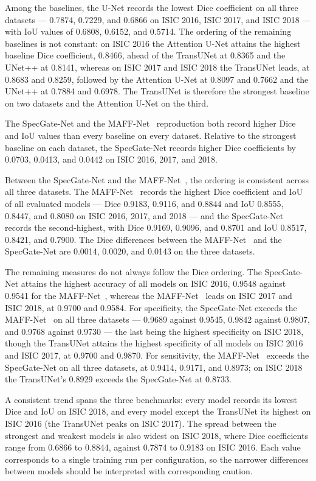 Among the baselines, the U-Net records the lowest Dice coefficient on all three datasets --- 0.7874, 0.7229, and 0.6866 on ISIC 2016, ISIC 2017, and ISIC 2018 --- with IoU values of 0.6808, 0.6152, and 0.5714. The ordering of the remaining baselines is not constant: on ISIC 2016 the Attention U-Net attains the highest baseline Dice coefficient, 0.8466, ahead of the TransUNet at 0.8365 and the UNet++ at 0.8141, whereas on ISIC 2017 and ISIC 2018 the TransUNet leads, at 0.8683 and 0.8259, followed by the Attention U-Net at 0.8097 and 0.7662 and the UNet++ at 0.7884 and 0.6978. The TransUNet is therefore the strongest baseline on two datasets and the Attention U-Net on the third.

The SpecGate-Net and the MAFF-Net~\cite{ref15} reproduction both record higher Dice and IoU values than every baseline on every dataset. Relative to the strongest baseline on each dataset, the SpecGate-Net records higher Dice coefficients by 0.0703, 0.0413, and 0.0442 on ISIC 2016, 2017, and 2018.

Between the SpecGate-Net and the MAFF-Net~\cite{ref15}, the ordering is consistent across all three datasets. The MAFF-Net~\cite{ref15} records the highest Dice coefficient and IoU of all evaluated models --- Dice 0.9183, 0.9116, and 0.8844 and IoU 0.8555, 0.8447, and 0.8080 on ISIC 2016, 2017, and 2018 --- and the SpecGate-Net records the second-highest, with Dice 0.9169, 0.9096, and 0.8701 and IoU 0.8517, 0.8421, and 0.7900. The Dice differences between the MAFF-Net~\cite{ref15} and the SpecGate-Net are 0.0014, 0.0020, and 0.0143 on the three datasets.

The remaining measures do not always follow the Dice ordering. The SpecGate-Net attains the highest accuracy of all models on ISIC 2016, 0.9548 against 0.9541 for the MAFF-Net~\cite{ref15}, whereas the MAFF-Net~\cite{ref15} leads on ISIC 2017 and ISIC 2018, at 0.9700 and 0.9584. For specificity, the SpecGate-Net exceeds the MAFF-Net~\cite{ref15} on all three datasets --- 0.9689 against 0.9545, 0.9842 against 0.9807, and 0.9768 against 0.9730 --- the last being the highest specificity on ISIC 2018, though the TransUNet attains the highest specificity of all models on ISIC 2016 and ISIC 2017, at 0.9700 and 0.9870. For sensitivity, the MAFF-Net~\cite{ref15} exceeds the SpecGate-Net on all three datasets, at 0.9414, 0.9171, and 0.8973; on ISIC 2018 the TransUNet's 0.8929 exceeds the SpecGate-Net at 0.8733.

A consistent trend spans the three benchmarks: every model records its lowest Dice and IoU on ISIC 2018, and every model except the TransUNet its highest on ISIC 2016 (the TransUNet peaks on ISIC 2017). The spread between the strongest and weakest models is also widest on ISIC 2018, where Dice coefficients range from 0.6866 to 0.8844, against 0.7874 to 0.9183 on ISIC 2016. Each value corresponds to a single training run per configuration, so the narrower differences between models should be interpreted with corresponding caution.

